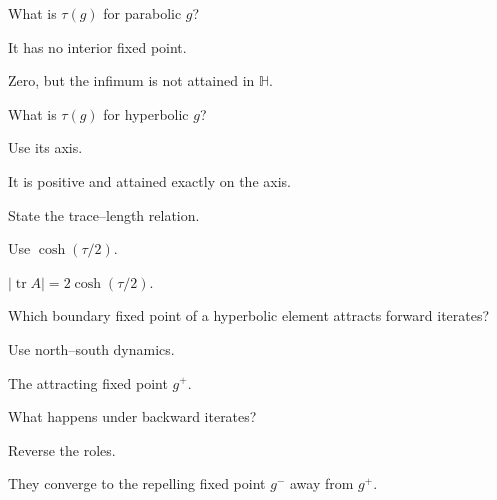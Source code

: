\begin{exercise}\label{exr:vii34-16}
What is \(\tau(g)\) for parabolic \(g\)?
\end{exercise}
\begin{hint}
It has no interior fixed point.
\end{hint}
\begin{solution}
Zero, but the infimum is not attained in \(\mathbb H\).
\end{solution}

\begin{exercise}\label{exr:vii34-17}
What is \(\tau(g)\) for hyperbolic \(g\)?
\end{exercise}
\begin{hint}
Use its axis.
\end{hint}
\begin{solution}
It is positive and attained exactly on the axis.
\end{solution}

\begin{exercise}\label{exr:vii34-18}
State the trace--length relation.
\end{exercise}
\begin{hint}
Use \(\cosh(\tau/2)\).
\end{hint}
\begin{solution}
\(|\operatorname{tr}A|=2\cosh(\tau/2)\).
\end{solution}

\begin{exercise}\label{exr:vii34-19}
Which boundary fixed point of a hyperbolic element attracts forward iterates?
\end{exercise}
\begin{hint}
Use north--south dynamics.
\end{hint}
\begin{solution}
The attracting fixed point \(g^+\).
\end{solution}

\begin{exercise}\label{exr:vii34-20}
What happens under backward iterates?
\end{exercise}
\begin{hint}
Reverse the roles.
\end{hint}
\begin{solution}
They converge to the repelling fixed point \(g^-\) away from \(g^+\).
\end{solution}

